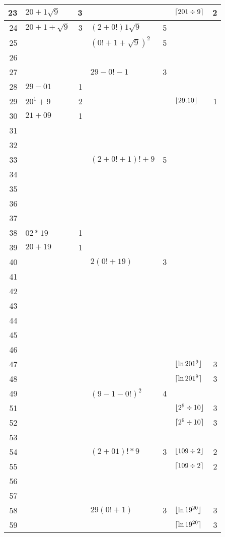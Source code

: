 \begin{longtable}{r l r l r l r}
23 & $20+1\sqrt{9}$ & 3 & & & $\lceil201\div9\rceil$ & 2 \\ \midrule
24 & $20+1+\sqrt{9}$ & 3 & $(2+0!)1\sqrt{9}$ & 5 \\ \midrule
25 & & & ${(0!+1+\sqrt{9})}^{2}$ & 5 \\ \midrule
26 & & \\ \midrule
27 & & & $29-0!-1$ & 3 \\ \midrule
28 & $29-01$ & 1 \\ \midrule
29 & $20^1+9$ & 2 & & & $\lfloor29.10\rfloor$ & 1\\ \midrule
\midrule
30 & $21+09$ & 1 \\ \midrule
31 & & \\ \midrule
32 & & \\ \midrule
33 & & & $(2+0!+1)!+9$ & 5 \\ \midrule
34 & & \\ \midrule
35 & & \\ \midrule
36 & & \\ \midrule
37 & & \\ \midrule
38 & $02*19$ & 1 \\ \midrule
39 & $20+19$ & 1 \\ \midrule
\midrule
40 & & & $2(0!+19)$ & 3 \\ \midrule
41 & & \\ \midrule
42 & & \\ \midrule
43 & & \\ \midrule
44 & & \\ \midrule
45 & & \\ \midrule
46 & & \\ \midrule
47 & & & & & $\lfloor\ln 201^9\rfloor$ & 3 \\ \midrule
48 & & & & & $\lceil\ln 201^9\rceil$ & 3 \\ \midrule
49 & & & ${(9-1-0!)}^2$ & 4 \\ \midrule
\midrule
51 & & & & & $\lfloor2^9\div10\rfloor$ & 3 \\ \midrule
52 & & & & & $\lceil2^9\div10\rceil$ & 3 \\ \midrule
53 & & \\ \midrule
54 & & & $(2+01)!*9$ & 3 & $\lfloor109\div2\rfloor$ & 2 \\ \midrule
55 & & & & & $\lceil109\div2\rceil$ & 2 \\ \midrule
56 & & \\ \midrule
57 & & \\ \midrule
58 & & & $29(0!+1)$ & 3 & $\lfloor\ln 19^{20}\rfloor$ & 3 \\ \midrule
59 & & & & & $\lceil\ln 19^{20}\rceil$ & 3 \\ \midrule

\end{longtable}
